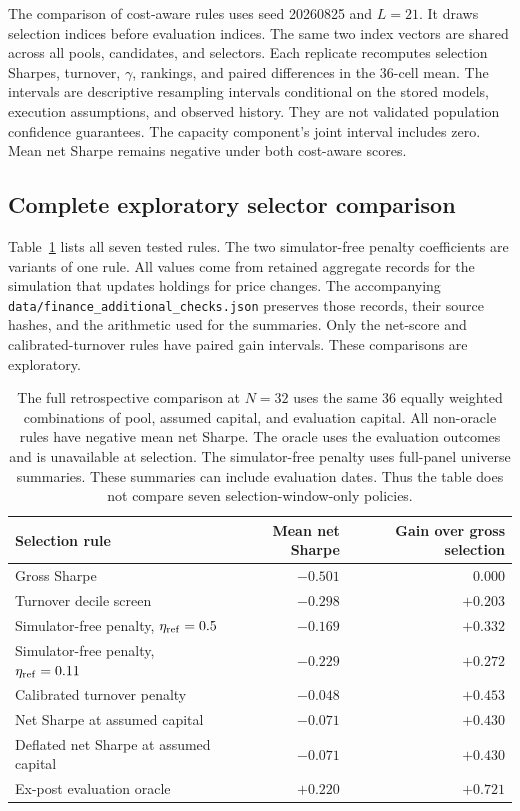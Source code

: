 \documentclass[10pt,letterpaper]{article}
\begin{document}
The comparison of cost-aware rules uses seed 20260825 and $L=21$. It draws selection indices before evaluation indices. The same two index vectors are shared across all pools, candidates, and selectors. Each replicate recomputes selection Sharpes, turnover, $\gamma$, rankings, and paired differences in the 36-cell mean. The intervals are descriptive resampling intervals conditional on the stored models, execution assumptions, and observed history. They are not validated population confidence guarantees. The capacity component's joint interval includes zero. Mean net Sharpe remains negative under both cost-aware scores.

\subsection{Complete exploratory selector comparison}\label{sec:all-selectors}
Table~\ref{tab:all-selectors} lists all seven tested rules. The two simulator-free penalty coefficients are variants of one rule. All values come from retained aggregate records for the simulation that updates holdings for price changes. The accompanying \texttt{data/finance\_additional\_checks.json} preserves those records, their source hashes, and the arithmetic used for the summaries. Only the net-score and calibrated-turnover rules have paired gain intervals. These comparisons are exploratory.

\begin{table}[htbp]
\centering
\begin{tabular}{@{}lrr@{}}
\toprule
Selection rule & Mean net Sharpe & Gain over gross selection\\
\midrule
Gross Sharpe & $-0.501$ & $0.000$\\
Turnover decile screen & $-0.298$ & $+0.203$\\
Simulator-free penalty, $\eta_{\rm ref}=0.5$ & $-0.169$ & $+0.332$\\
Simulator-free penalty, $\eta_{\rm ref}=0.11$ & $-0.229$ & $+0.272$\\
Calibrated turnover penalty & $-0.048$ & $+0.453$\\
Net Sharpe at assumed capital & $-0.071$ & $+0.430$\\
Deflated net Sharpe at assumed capital & $-0.071$ & $+0.430$\\
Ex-post evaluation oracle & $+0.220$ & $+0.721$\\
\bottomrule
\end{tabular}
\caption{The full retrospective comparison at $N=32$ uses the same 36 equally weighted combinations of pool, assumed capital, and evaluation capital. All non-oracle rules have negative mean net Sharpe. The oracle uses the evaluation outcomes and is unavailable at selection. The simulator-free penalty uses full-panel universe summaries. These summaries can include evaluation dates. Thus the table does not compare seven selection-window-only policies.}
\label{tab:all-selectors}
\end{table}
\FloatBarrier
\end{document}
